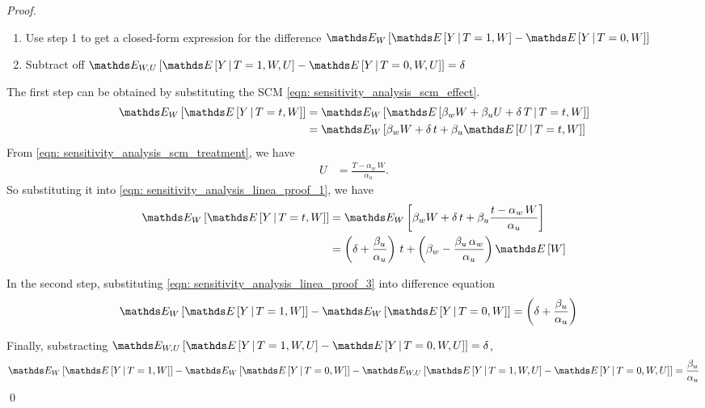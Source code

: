 \documentclass[11pt]{article}
\begin{document}
\begin{itemize}
\begin{proof}
\begin{enumerate}
\item Use step 1 to get a closed-form expression for the difference
$\E{W}{\E{}{Y \,|\, T=1, W} - \E{}{Y \,|\, T=0, W}}$

\item Subtract off $\E{W, U}{\E{}{Y \,|\, T=1, W, U} - \E{}{Y \,|\, T=0, W, U}} = \delta$
 \end{enumerate}
 
 The first step can be obtained by substituting the SCM  \eqref{eqn: sensitivity_analysis_scm_effect}.
 \begin{align}
 \E{W}{\E{}{Y \,|\, T=t, W}} &= \E{W}{\E{}{\beta_{w} W +  \beta_u U + \delta\,T \,|\, T=t, W}} \nonumber \\
 &= \E{W}{\beta_{w}W + \delta\,t + \beta_u \E{}{U \,|\, T=t, W}  }  \label{eqn: sensitivity_analysis_linea_proof_1}
 \end{align} From \eqref{eqn: sensitivity_analysis_scm_treatment}, we have 
 \begin{align}
 U &= \frac{T - \alpha_w\, W}{\alpha_{u}}.  \label{eqn: sensitivity_analysis_linea_proof_2}
 \end{align} So substituting it into \eqref{eqn: sensitivity_analysis_linea_proof_1}, we have
 \begin{align}
 \E{W}{\E{}{Y \,|\, T=t, W}} &=  \E{W}{\beta_{w}W + \delta\,t + \beta_u  \frac{t - \alpha_w\, W}{\alpha_{u}}  }  \nonumber\\
 &= \paren{\delta+ \frac{\beta_u}{\alpha_u} }\,t + \paren{\beta_w - \frac{\beta_u\,\alpha_w}{\alpha_u}}\E{}{W}   \label{eqn: sensitivity_analysis_linea_proof_3}
 \end{align}
 
 In the second step, substituting \eqref{eqn: sensitivity_analysis_linea_proof_3} into difference equation
 \begin{align}
 \E{W}{\E{}{Y \,|\, T=1, W}} - \E{W}{\E{}{Y \,|\, T=0, W}} &= \paren{\delta+ \frac{\beta_u}{\alpha_u} }  \label{eqn: sensitivity_analysis_linea_proof_4}
 \end{align}
 
 Finally, substracting $\E{W, U}{\E{}{Y \,|\, T=1, W, U} - \E{}{Y \,|\, T=0, W, U}} = \delta$, 
 \begin{align*}
  \E{W}{\E{}{Y \,|\, T=1, W}} - \E{W}{\E{}{Y \,|\, T=0, W}} - \E{W, U}{\E{}{Y \,|\, T=1, W, U} - \E{}{Y \,|\, T=0, W, U}} = \frac{\beta_u}{\alpha_u}
 \end{align*} \qed
 \end{proof}
 
\end{itemize}
\end{document}
